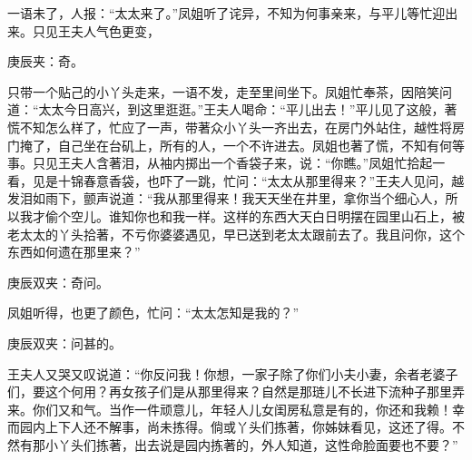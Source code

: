 \begin{parag}
    一语未了，人报：“太太来了。”凤姐听了诧异，不知为何事亲来，与平儿等忙迎出来。只见王夫人气色更变，\begin{note}庚辰夹：奇。\end{note}只带一个贴己的小丫头走来，一语不发，走至里间坐下。凤姐忙奉茶，因陪笑问道：“太太今日高兴，到这里逛逛。”王夫人喝命：“平儿出去！”平儿见了这般，著慌不知怎么样了，忙应了一声，带著众小丫头一齐出去，在房门外站住，越性将房门掩了，自己坐在台矶上，所有的人，一个不许进去。凤姐也著了慌，不知有何等事。只见王夫人含著泪，从袖内掷出一个香袋子来，说：“你瞧。”凤姐忙拾起一看，见是十锦春意香袋，也吓了一跳，忙问：“太太从那里得来？”王夫人见问，越发泪如雨下，颤声说道：“我从那里得来！我天天坐在井里，拿你当个细心人，所以我才偷个空儿。谁知你也和我一样。这样的东西大天白日明摆在园里山石上，被老太太的丫头拾著，不亏你婆婆遇见，早已送到老太太跟前去了。我且问你，这个东西如何遗在那里来？”\begin{note}庚辰双夹：奇问。\end{note}凤姐听得，也更了颜色，忙问：“太太怎知是我的？”\begin{note}庚辰双夹：问甚的。\end{note}王夫人又哭又叹说道：“你反问我！你想，一家子除了你们小夫小妻，余者老婆子们，要这个何用？再女孩子们是从那里得来？自然是那琏儿不长进下流种子那里弄来。你们又和气。当作一件顽意儿，年轻人儿女闺房私意是有的，你还和我赖！幸而园内上下人还不解事，尚未拣得。倘或丫头们拣著，你姊妹看见，这还了得。不然有那小丫头们拣著，出去说是园内拣著的，外人知道，这性命脸面要也不要？”
\end{parag}


